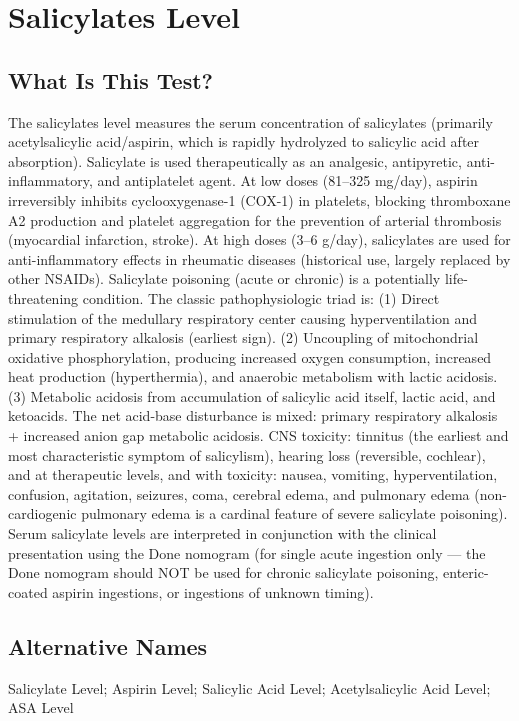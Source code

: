 \chapter{Salicylates Level}
\section*{What Is This Test?}
The salicylates level measures the serum concentration of salicylates (primarily acetylsalicylic acid/aspirin, which is rapidly hydrolyzed to salicylic acid after absorption). Salicylate is used therapeutically as an analgesic, antipyretic, anti-inflammatory, and antiplatelet agent. At low doses (81--325 mg/day), aspirin irreversibly inhibits cyclooxygenase-1 (COX-1) in platelets, blocking thromboxane A2 production and platelet aggregation for the prevention of arterial thrombosis (myocardial infarction, stroke). At high doses (3--6 g/day), salicylates are used for anti-inflammatory effects in rheumatic diseases (historical use, largely replaced by other NSAIDs). Salicylate poisoning (acute or chronic) is a potentially life-threatening condition. The classic pathophysiologic triad is: (1) Direct stimulation of the medullary respiratory center causing hyperventilation and primary respiratory alkalosis (earliest sign). (2) Uncoupling of mitochondrial oxidative phosphorylation, producing increased oxygen consumption, increased heat production (hyperthermia), and anaerobic metabolism with lactic acidosis. (3) Metabolic acidosis from accumulation of salicylic acid itself, lactic acid, and ketoacids. The net acid-base disturbance is mixed: primary respiratory alkalosis + increased anion gap metabolic acidosis. CNS toxicity: tinnitus (the earliest and most characteristic symptom of salicylism), hearing loss (reversible, cochlear), and at therapeutic levels, and with toxicity: nausea, vomiting, hyperventilation, confusion, agitation, seizures, coma, cerebral edema, and pulmonary edema (non-cardiogenic pulmonary edema is a cardinal feature of severe salicylate poisoning). Serum salicylate levels are interpreted in conjunction with the clinical presentation using the Done nomogram (for single acute ingestion only --- the Done nomogram should NOT be used for chronic salicylate poisoning, enteric-coated aspirin ingestions, or ingestions of unknown timing).
\section*{Alternative Names}
Salicylate Level; Aspirin Level; Salicylic Acid Level; Acetylsalicylic Acid Level; ASA Level
